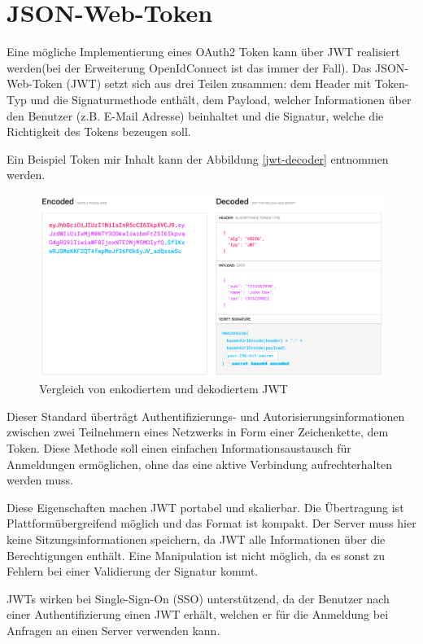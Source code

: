 \section{JSON-Web-Token}
Eine mögliche Implementierung eines OAuth2 Token kann über JWT realisiert werden(bei der Erweiterung OpenIdConnect ist das immer der Fall).
Das JSON-Web-Token (JWT) setzt sich aus drei Teilen zusammen: dem Header mit Token-Typ und die Signaturmethode enthält, dem Payload, welcher Informationen über den Benutzer (z.B. E-Mail Adresse) beinhaltet und die Signatur, welche die Richtigkeit des Tokens bezeugen soll.\cite{jwt}

Ein Beispiel Token mir Inhalt kann der Abbildung \vref{jwt-decoder} entnommen werden.

\begin{figure}[ht]
	\centering
	\includegraphics[width=1 \linewidth]{jwt.png}
	\caption{Vergleich von enkodiertem und dekodiertem JWT}
	\label{jwt-decoder}
\end{figure}

Dieser Standard überträgt Authentifizierungs- und Autorisierungsinformationen zwischen zwei Teilnehmern eines Netzwerks in Form einer Zeichenkette, dem Token. Diese Methode soll einen einfachen Informationsaustausch für Anmeldungen ermöglichen, ohne das eine aktive Verbindung aufrechterhalten werden muss.

Diese Eigenschaften machen JWT portabel und skalierbar. Die Übertragung ist Plattformübergreifend möglich und das Format ist kompakt. Der Server muss hier keine Sitzungsinformationen speichern, da JWT alle Informationen über die Berechtigungen enthält. Eine Manipulation ist nicht möglich, da es sonst zu Fehlern bei einer Validierung der Signatur kommt.\cite{ionos-jwt}

JWTs wirken bei Single-Sign-On (SSO) unterstützend, da der Benutzer nach einer Authentifizierung einen JWT erhält, welchen er für die Anmeldung bei Anfragen an einen Server verwenden kann.